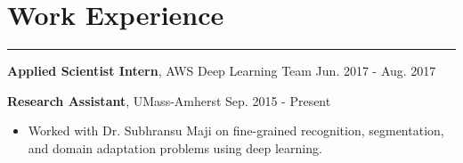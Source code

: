 \documentclass[10pt,letterpaper]{article}
\begin{document}

					
\section*{Work Experience} \vspace{-5pt}
\hrule \vspace{10pt}
{\bf Applied Scientist Intern}, AWS Deep Learning Team \hfill Jun. 2017 - Aug. 2017
\vspace{5pt}

\noindent 
{\bf Research Assistant}, UMass-Amherst \hfill Sep. 2015 - Present
\begin{itemize}
\item Worked with Dr. Subhransu Maji on fine-grained recognition, segmentation, and domain adaptation problems using deep learning.
\end{itemize}
\vspace{5pt}
\end{document}
